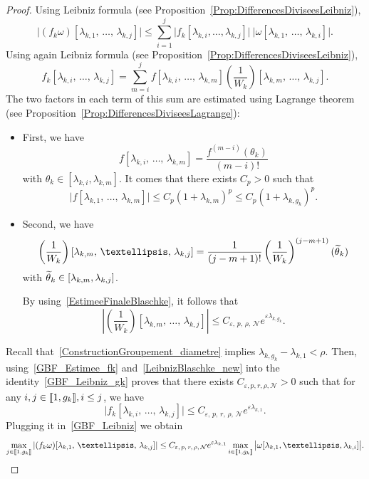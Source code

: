 \documentclass[11pt]{article}
\theoremstyle{definition}
\numberwithin{equation}{section}
\numberwithin{figure}{section}
\numberwithin{table}{section}
\newcommand{\llbracket}{\mathopen{[\mkern -2.7mu[}}
\newcommand{\rrbracket}{\mathclose{]\mkern -2.7mu]}}
\newcommand{\inter}[2]{\llbracket #1,#2 \rrbracket}
\newcommand{\n}{g}
\newcommand{\NN}{\mathcal{N}}
\let\oldtilde\tilde
\renewcommand*{\tilde}[1]{\mathchoice{\widetilde{#1}}{\widetilde{#1}}{\oldtilde{#1}}{\oldtilde{#1}}}\let\oldexists\exists
\renewcommand*{\exists}{\mathrel{\oldexists}}
\begin{document}
\begin{proof}
Using Leibniz formula (see Proposition~\ref{Prop:DifferencesDiviseesLeibniz}),
\begin{equation}\label{GBF_Leibniz}
\big| (f_k \omega) [\lambda_{k,1},\,\dots,\, \lambda_{k,j}] \big|
\leq \sum_{i=1}^j \big| f_k[\lambda_{k,i},\dots,\lambda_{k,j}] \big| \: \big| \omega[\lambda_{k,1},\,\dots,\,\lambda_{k,i}] \big|.
\end{equation}
Using again Leibniz formula (see Proposition~\ref{Prop:DifferencesDiviseesLeibniz}),
\begin{equation}\label{GBF_Leibniz_gk}
f_k[\lambda_{k,i},\,\dots,\,\lambda_{k,j}] = \sum_{m=i}^j f[\lambda_{k,i},\,\dots,\,\lambda_{k,m}] \left(\frac{1}{W_k} \right)[\lambda_{k,m},\,\dots,\,\lambda_{k,j}].
\end{equation}
The two factors in each term of this sum are estimated using Lagrange theorem (see Proposition~\ref{Prop:DifferencesDiviseesLagrange}):
\begin{itemize}
\item First, we have
\[
f[\lambda_{k,i},\,\dots,\,\lambda_{k,m}] = \frac{f^{(m-i)}(\theta_k)}{(m-i)!}
\]
with $\theta_k \in [\lambda_{k,i}, \lambda_{k,m}]$. It comes that there exists $C_p>0$ such that
\begin{equation}\label{GBF_Estimee_fk}
\big| f[\lambda_{k,1},\,\dots,\,\lambda_{k,m}] \big| \leq C_p (1+\lambda_{k,m})^p \leq C_p (1+\lambda_{k,\n_k})^p.
\end{equation}
\item Second, we have
\begin{equation*}
\left(\frac{1}{W_k} \right)[\lambda_{k,m},\, \dots,\,\lambda_{k,j}] = \frac{1}{(j-m+1)!} \left(\frac{1}{W_k} \right)^{(j-m+1)}(\tilde{\theta}_k)
\end{equation*}
with $\tilde{\theta}_k \in [\lambda_{k,m},\lambda_{k,j}]$.


By using~\eqref{EstimeeFinaleBlaschke}, it follows that
\begin{equation}\label{LeibnizBlaschke_new}
\left|\left(\frac{1}{W_k} \right)[\lambda_{k,m},\,\dots,\,\lambda_{k,j}]\right| \leq C_{\varepsilon,\,p,\, \rho,\, \NN} e^{\varepsilon \lambda_{k,\n_k}}.
\end{equation}
\end{itemize}


Recall that~\eqref{ConstructionGroupement_diametre} implies $\lambda_{k,\n_k} - \lambda_{k,1} < \rho$. Then, using~\eqref{GBF_Estimee_fk} and~\eqref{LeibnizBlaschke_new} into the identity~\eqref{GBF_Leibniz_gk} proves that there exists $C_{\varepsilon, p, r, \rho, \NN}>0$ such that for any $i,j\in \inter{1}{\n_k}, i\leq j$, we have
\[
\big| f_k[\lambda_{k,i},\,\dots,\, \lambda_{k,j}] \big| \leq C_{\varepsilon,\, p,\, r,\, \rho,\, \NN} e^{\varepsilon \lambda_{k,1}}.
\]
Plugging it in~\eqref{GBF_Leibniz} we obtain
\[
\max_{j\in \inter{1}{\n_k}} \left| (f_k \omega) [\lambda_{k,1},\,\dots,\, \lambda_{k,j}] \right| \leq C_{\varepsilon,\, p,\, r,\, \rho,\, \NN} e^{\varepsilon \lambda_{k,1}} \max \limits_{i\in \inter{1}{\n_k}} \big| \omega[\lambda_{k,1}, \dots, \lambda_{k,i}] \big|.
\]


\end{proof}
\end{document}
